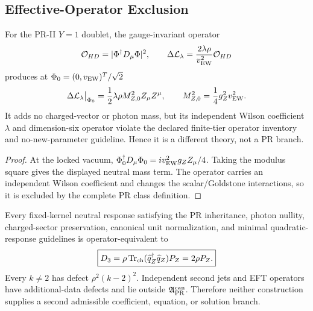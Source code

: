 \subsection{Effective-Operator Exclusion}

\begin{proposition}
\label{prop:pr35-z-local-counteroperator}
For the PR-II $Y=1$ doublet, the gauge-invariant operator
\begin{equation}
 \mathcal O_{HD}
 =|\Phi^\dagger D_\mu\Phi|^2,
 \qquad
 \Delta\mathcal L_\lambda
 =\frac{2\lambda\rho}{v_{\rm EW}^2}\mathcal O_{HD}
 \label{eq:pr35-z-local-counteroperator}
\end{equation}
produces at $\Phi_0=(0,v_{\rm EW})^T/\sqrt2$
\begin{equation}
 \Delta\mathcal L_\lambda\big|_{\Phi_0}
 =\frac12\lambda\rho M_{Z,0}^2Z_\mu Z^\mu,
 \qquad M_{Z,0}^2=\frac14g_Z^2v_{\rm EW}^2.
\end{equation}
It adds no charged-vector or photon mass, but its independent Wilson \cite{Wilson_1975} coefficient $\lambda$ and dimension-six operator violate the declared
finite-tier operator inventory and no-new-parameter guideline.  Hence it is a
different theory, not a PR branch.
\end{proposition}

\begin{proof}
At the locked vacuum,
$\Phi_0^\dagger D_\mu\Phi_0
=iv_{\rm EW}^2g_ZZ_\mu/4$.  Taking the modulus square gives the displayed
neutral mass term.  The operator carries an independent Wilson coefficient and
changes the scalar/Goldstone interactions, so it is excluded by the complete
PR class definition.
\end{proof}

\begin{proposition}
Every fixed-kernel neutral response satisfying the PR inheritance, photon
nullity, charged-sector preservation, canonical unit normalization, and
minimal quadratic-response guidelines is operator-equivalent to
\begin{equation}
 \boxed{D_3=\rho\operatorname{Tr}_{\rm ch}
 (\widehat q_Z^\dagger\widehat q_Z)P_Z=2\rho P_Z.}
\end{equation}
Every $k\ne2$ has defect $\rho^2(k-2)^2$.  Independent second jets and EFT operators have additional-data defects and lie outside $\mathfrak A_{\rm PR}^{\rm can}$.  Therefore neither construction supplies a
second admissible coefficient, equation, or solution branch.
\end{proposition}

